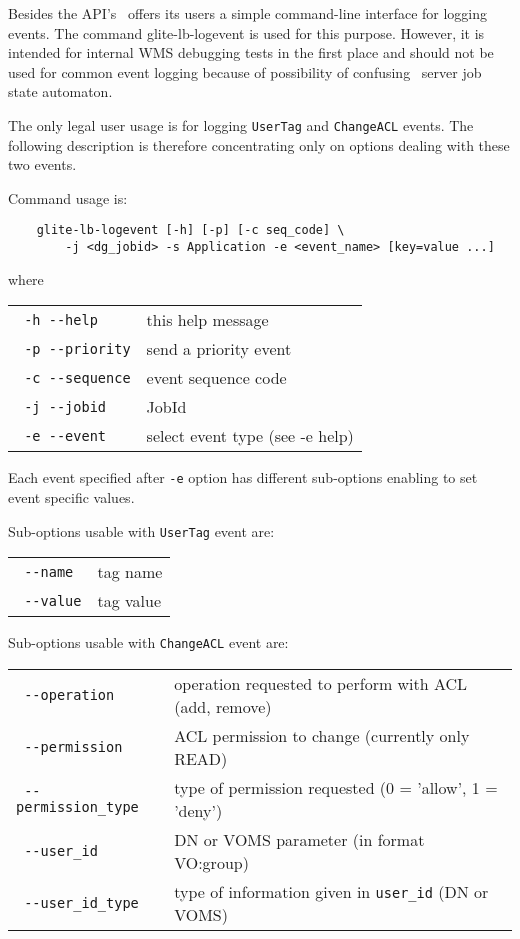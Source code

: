 Besides the API's \LB\ offers its users a simple command-line interface for
logging events. The command glite-lb-logevent is used for this purpose. However, it
is intended for internal WMS debugging tests in the first place and should not
be used for common event logging because of possibility of confusing \LB\
server job state automaton.

The only legal user usage is for logging \verb'UserTag' and \verb'ChangeACL' events. The following description is therefore concentrating only on options dealing with these two events.

Command usage is:

\begin{verbatim}
    glite-lb-logevent [-h] [-p] [-c seq_code] \
        -j <dg_jobid> -s Application -e <event_name> [key=value ...]
\end{verbatim}

where

\begin{tabularx}{\textwidth}{lX}
\texttt{  -h  -{}-help} &           this help message\\
\texttt{  -p  -{}-priority} &       send a priority event\\
\texttt{  -c  -{}-sequence} &       event sequence code\\
\texttt{  -j  -{}-jobid} &          JobId\\
\texttt{  -e  -{}-event} &           select event type (see -e help)\\
\end{tabularx}

\medskip

Each event specified after \verb'-e' option has different sub-options enabling to set event specific values.

Sub-options usable with \verb'UserTag' event are:


\begin{tabularx}{\textwidth}{lX}
\texttt{      -{}-name}  &          tag name\\
\texttt{      -{}-value} &          tag value\\
\end{tabularx}

\medskip

Sub-options usable with \verb'ChangeACL' event are:

\begin{tabularx}{\textwidth}{lX}
\texttt{      -{}-operation} &       operation requested to perform with ACL (add, remove)\\
\texttt{      -{}-permission} &      ACL permission to change (currently only READ)\\
\texttt{      -{}-permission\_type} & type of permission requested (0 = 'allow', 1 = 'deny')\\
\texttt{      -{}-user\_id} &         DN or VOMS parameter (in format VO:group)\\
\texttt{      -{}-user\_id\_type} &    type of information given in \verb'user_id' (DN or VOMS)\\
\end{tabularx}

